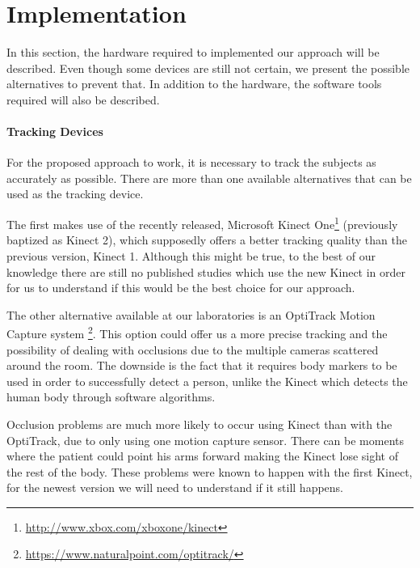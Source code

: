\chapter{Implementation}
\label{sec:implementation}
 
In this section, the hardware required to implemented our approach will be described. Even though some devices are still not certain, we present the possible alternatives to prevent that. In addition to the hardware, the software tools required will also be described. 

\subsubsection{Tracking Devices}

For the proposed approach to work, it is necessary to track the subjects as accurately as possible. There are more than one available alternatives that can be used as the tracking device.

The first makes use of the recently released, Microsoft Kinect One\footnote{\url{http://www.xbox.com/xboxone/kinect}} 
(previously baptized as Kinect 2), which supposedly offers a better tracking quality than 
the previous version, Kinect 1. Although this might be true, to the best of our knowledge there are still no published studies which use the new Kinect in order for us to understand if this would be the best choice for our approach.

The other alternative available at our laboratories is an OptiTrack Motion Capture system \footnote{\url{https://www.naturalpoint.com/optitrack/}}. 
This option could offer us a more precise tracking and the possibility of dealing with occlusions due to the multiple cameras scattered around the room. The downside is the fact that 
it requires body markers to be used in order to successfully detect a person, unlike the 
Kinect which detects the human body through software algorithms.

Occlusion problems are much more likely to occur using Kinect than with the OptiTrack, due to only using one motion capture sensor. There can be moments where the patient could point his arms forward making the Kinect lose sight of the rest of the body. These problems were known to happen with the first Kinect, for the newest version we will need to understand if it still happens.

